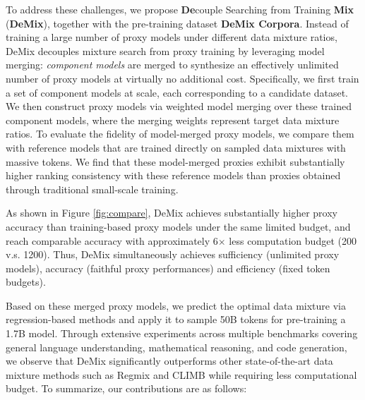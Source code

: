 \documentclass{article}
\theoremstyle{plain}
\theoremstyle{definition}
\theoremstyle{remark}
\begin{document}
To address these challenges, we propose \textbf{De}couple Searching from Training \textbf{Mix} (\textbf{DeMix}), together with the pre-training dataset \textbf{DeMix Corpora}. Instead of training a large number of proxy models under different data mixture ratios, DeMix decouples mixture search from proxy training by leveraging model merging: \textit{component models} are merged to synthesize an effectively unlimited number of proxy models at virtually no additional cost.
Specifically, we first train a set of component models at scale, each corresponding to a candidate dataset.
We then construct proxy models via weighted model merging over these trained component models, where the merging weights represent target data mixture ratios.
To evaluate the fidelity of model-merged proxy models, we compare them with reference models that are trained directly on sampled data mixtures with massive tokens. We find that these model-merged proxies exhibit substantially higher ranking consistency with these reference models than proxies obtained through traditional small-scale training.

As shown in Figure \ref{fig:compare}, DeMix achieves substantially higher proxy accuracy than training-based proxy models under the same limited budget, and reach comparable accuracy with approximately 6$\times$ less computation budget (200 v.s. 1200). Thus, DeMix simultaneously achieves sufficiency (unlimited proxy models), accuracy (faithful proxy performances) and efficiency (fixed token budgets).

Based on these merged proxy models, we predict the optimal data mixture via regression-based methods and apply it to sample 50B tokens for pre-training a 1.7B model. Through extensive experiments across multiple benchmarks covering general language understanding, mathematical reasoning, and code generation, we observe that DeMix significantly outperforms other state-of-the-art data mixture methods such as Regmix and CLIMB while requiring less computational budget. To summarize, our contributions are as follows:
\end{document}
